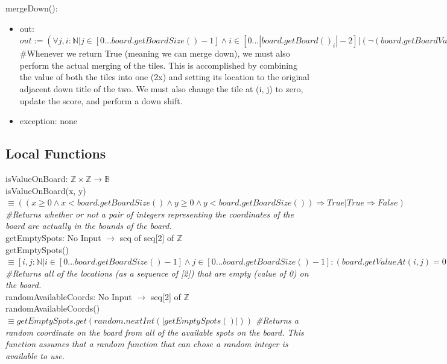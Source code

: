 \documentclass[12pt]{article}
\begin{document}
\noindent mergeDown():
\begin{itemize}
\item out: $out := (\forall j,i : \mathbb{N} \vert j \in [0...board.getBoardSize() - 1] \land i \in [0...|board.getBoard()_i| - 2] \vert (\lnot (board.getBoardValueAt(i, j) = 0) \land \lnot (board.getBoardValueAt(i - 1, j) = 0) \Rightarrow (board.getBoardValueAt(i, j) = board.getBoardValueAt(i - 1, j)) \Rightarrow True) \vert (True \Rightarrow False)))$\\
\#Whenever we return True (meaning we can merge down), we must also perform the actual merging of the tiles. This is accomplished by combining the value of both the tiles into one (2x) and setting its location to the original adjacent down title of the two. We must also change the tile at (i, j) to zero, update the score, and perform a down shift.
\item exception: none
\end{itemize}

\subsection*{Local Functions}

\noindent isValueOnBoard: $\mathbb{Z} \times \mathbb{Z}  \rightarrow \mathbb{B}$\\
\noindent
isValueOnBoard(x, y) $\equiv ((x \ge 0 \land x < board.getBoardSize() \land y \ge 0 \land y < board.getBoardSize()) \Rightarrow True \vert True \Rightarrow False)$
\textit{\#Returns whether or not a pair of integers representing the coordinates of the  board are actually in the bounds of the board.}
~\\

\noindent getEmptySpots: No Input  $\rightarrow$ seq of seq[2] of $\mathbb{Z}$\\
\noindent
getEmptySpots() $\equiv [i,j : \mathbb{N} \vert i \in [0...board.getBoardSize() - 1] \land j \in [0...board.getBoardSize() - 1] : (board.getValueAt(i, j) = 0 \Rightarrow \langle i,j \rangle)]$
\textit{\#Returns all of the locations (as a sequence of [2]) that are empty (value of 0) on the board.}
~\\

\noindent randomAvailableCoords: No Input  $\rightarrow$ seq[2] of $\mathbb{Z}$\\
\noindent
randomAvailableCoords() $\equiv getEmptySpots.get(random.nextInt(|getEmptySpots()|))$
\textit{\#Returns a random coordinate on the board from all of the available spots on the board. This function assumes that a random function that can chose a random integer is available to use.}
~\\
\end{document}
